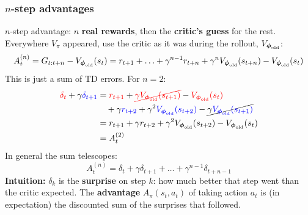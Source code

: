 \begin{frame}
    \frametitle{$n$-step advantages}
    $n$-step advantage: $n$ \textbf{real rewards}, then the \textbf{critic's guess} for the rest.
    Everywhere $V_\pi$ appeared, use the critic as it was during the rollout, $V_{{\boldsymbol{\phi}}_{\text{old}}}$:
    $$
    A^{(n)}_t = G_{t:t+n} - V_{{\boldsymbol{\phi}}_{\text{old}}}(s_t) = r_{t+1} + \ldots + \gamma^{n-1} r_{t+n}
    + \gamma^n V_{{\boldsymbol{\phi}}_{\text{old}}}(s_{t+n}) - V_{{\boldsymbol{\phi}}_{\text{old}}}(s_t)
    $$
    \pause
    This is just a sum of TD errors. For $n = 2$:
    \begin{align*}
        \textcolor{red}{\delta_t} + \gamma \textcolor{blue}{\delta_{t+1}}
        &= \textcolor{red}{r_{t+1}} + \textcolor{red}{\cancel{\gamma V_{{\boldsymbol{\phi}}_{\text{old}}}(s_{t+1})}} - \textcolor{red}{V_{{\boldsymbol{\phi}}_{\text{old}}}(s_t)} \\
        &\quad + \gamma \textcolor{blue}{r_{t+2}} + \gamma^2 \textcolor{blue}{V_{{\boldsymbol{\phi}}_{\text{old}}}(s_{t+2})} - \cancel{\gamma \textcolor{blue}{V_{{\boldsymbol{\phi}}_{\text{old}}}(s_{t+1})}} \\
        &= r_{t+1} + \gamma r_{t+2} + \gamma^2 V_{{\boldsymbol{\phi}}_{\text{old}}}(s_{t+2}) - V_{{\boldsymbol{\phi}}_{\text{old}}}(s_t) \\
        &= A^{(2)}_t
    \end{align*}
    \pause
    In general the sum telescopes:
    $$
    A^{(n)}_t = \delta_t + \gamma\delta_{t+1} + \ldots + \gamma^{n-1}\delta_{t+n-1}
    $$
    \pause
    \textbf{Intuition:} $\delta_k$ is the \textbf{surprise} on step $k$:
    how much better that step went than the critic expected.
    The \textbf{advantage} $A_\pi(s_t,a_t)$ of taking action $a_t$ is (in expectation) the
    discounted sum of the surprises that followed.
\end{frame}

